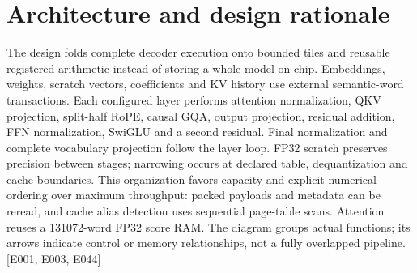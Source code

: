 \documentclass[11pt,a4paper]{article}
\begin{document}
\section{Architecture and design rationale}

The design folds complete decoder execution onto bounded tiles and reusable registered arithmetic instead of storing a whole model on chip. Embeddings,\allowbreak{} weights,\allowbreak{} scratch vectors,\allowbreak{} coefficients and KV history use external semantic-word transactions. Each configured layer performs attention normalization,\allowbreak{} QKV projection,\allowbreak{} split-half RoPE,\allowbreak{} causal GQA,\allowbreak{} output projection,\allowbreak{} residual addition,\allowbreak{} FFN normalization,\allowbreak{} SwiGLU and a second residual. Final normalization and complete vocabulary projection follow the layer loop. FP32 scratch preserves precision between stages; narrowing occurs at declared table,\allowbreak{} dequantization and cache boundaries. This organization favors capacity and explicit numerical ordering over maximum throughput: packed payloads and metadata can be reread,\allowbreak{} and cache alias detection uses sequential page-table scans. Attention reuses a 131072-word FP32 score RAM. The diagram groups actual functions; its arrows indicate control or memory relationships,\allowbreak{} not a fully overlapped pipeline. [\allowbreak{}E001,\allowbreak{} E003,\allowbreak{} E044]\allowbreak{}
\end{document}
